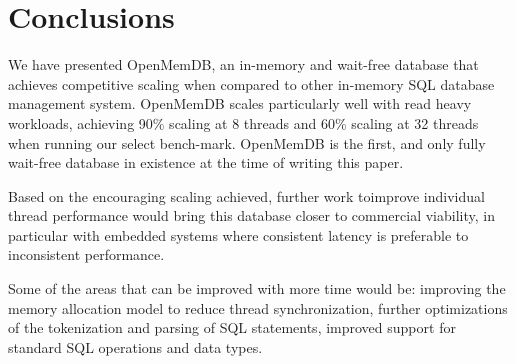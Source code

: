 \documentclass[conference, compsoc]{IEEEtran}
\begin{document}
\section{Conclusions}
We have presented OpenMemDB, an in-memory and wait-free database that achieves competitive scaling when compared to other
in-memory SQL database management system.  OpenMemDB scales particularly well with read heavy workloads, achieving 90\% 
scaling at 8 threads and 60\% scaling at 32 threads when running our select bench-mark. OpenMemDB is the first, and only fully
wait-free database in existence at the time of writing this paper. 
\par\vspace{\baselineskip}
Based on the encouraging scaling achieved, further work toimprove individual thread performance would bring this database
closer to commercial viability, in particular with embedded systems where consistent latency is preferable to inconsistent
performance. 
\par\vspace{\baselineskip}
Some of the areas that can be improved with more time would be: improving the memory allocation model to reduce thread
synchronization, further optimizations of the tokenization and parsing of SQL statements, improved support for standard
SQL operations and data types.

\newpage


\newpage
\end{document}
